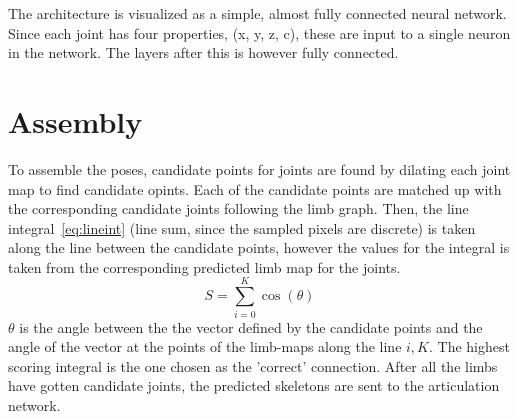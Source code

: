 The architecture is visualized as a simple, almost fully connected neural network. Since each joint has four properties, (x, y, z, c), these are input to a single neuron in the network. The layers after this is however fully connected.

\section{Assembly}

To assemble the poses, candidate points for joints are found by dilating each joint map to find candidate opints. Each of the candidate points are matched up with the corresponding candidate joints following the limb graph. Then, the line integral~\ref{eq:lineint} (line sum, since the sampled pixels are discrete) is taken along the line between the candidate points, however the values for the integral is taken from the corresponding predicted limb map for the joints.
\begin{equation}
  \label{eq:lineint}
  S = \sum_{i=0}^{K}\cos(\theta)
\end{equation}
$\theta$ is the angle between the the vector defined by the candidate points and the angle of the vector at the points of the limb-maps along the line $i, K$. The highest scoring integral is the one chosen as the 'correct' connection. After all the limbs have gotten candidate joints, the predicted skeletons are sent to the articulation network.


